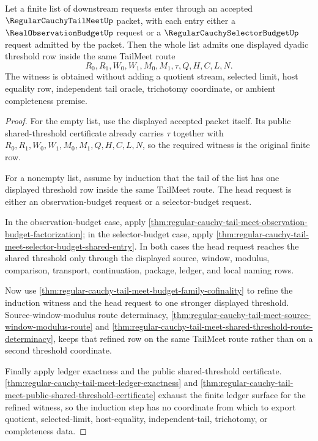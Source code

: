 \begin{theorem}
\label{thm:regular-cauchy-tail-meet-finite-witness-induction}
Let a finite list of downstream requests enter through an accepted $\RegularCauchyTailMeetUp$ packet, with each entry either a $\RealObservationBudgetUp$ request or a $\RegularCauchySelectorBudgetUp$ request admitted by the packet. Then the whole list admits one displayed dyadic threshold row inside the same TailMeet route
$$
R_0,R_1,W_0,W_1,M_0,M_1,\tau,Q,H,C,L,N.
$$
The witness is obtained without adding a quotient stream, selected limit, host equality row, independent tail oracle, trichotomy coordinate, or ambient completeness premise.
\end{theorem}
\begin{proof}
For the empty list, use the displayed accepted packet itself. Its public shared-threshold certificate already carries $\tau$ together with $R_0,R_1,W_0,W_1,M_0,M_1,Q,H,C,L,N$, so the required witness is the original finite row.

For a nonempty list, assume by induction that the tail of the list has one displayed threshold row inside the same TailMeet route. The head request is either an observation-budget request or a selector-budget request.

In the observation-budget case, apply \autoref{thm:regular-cauchy-tail-meet-observation-budget-factorization}; in the selector-budget case, apply \autoref{thm:regular-cauchy-tail-meet-selector-budget-shared-entry}. In both cases the head request reaches the shared threshold only through the displayed source, window, modulus, comparison, transport, continuation, package, ledger, and local naming rows.

Now use \autoref{thm:regular-cauchy-tail-meet-budget-family-cofinality} to refine the induction witness and the head request to one stronger displayed threshold. Source-window-modulus route determinacy, \autoref{thm:regular-cauchy-tail-meet-source-window-modulus-route} and \autoref{thm:regular-cauchy-tail-meet-shared-threshold-route-determinacy}, keeps that refined row on the same TailMeet route rather than on a second threshold coordinate.

Finally apply ledger exactness and the public shared-threshold certificate. \autoref{thm:regular-cauchy-tail-meet-ledger-exactness} and \autoref{thm:regular-cauchy-tail-meet-public-shared-threshold-certificate} exhaust the finite ledger surface for the refined witness, so the induction step has no coordinate from which to export quotient, selected-limit, host-equality, independent-tail, trichotomy, or completeness data.
\end{proof}

